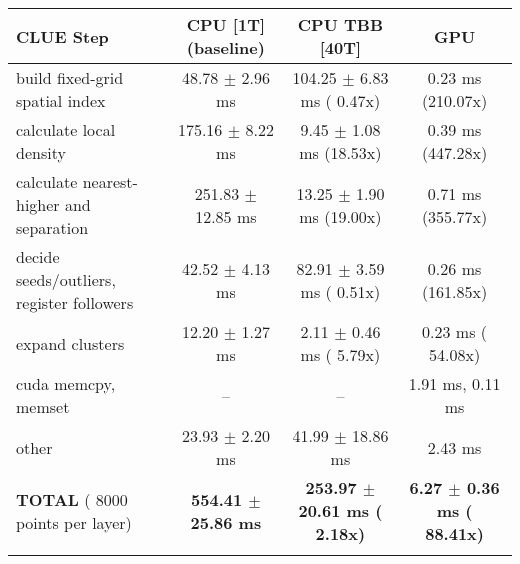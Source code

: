     \begin{tabular}{l|c|c|c}
    \hline
    CLUE Step                                 & CPU [1T] (baseline)         & CPU TBB [40T]                         & GPU                       \\ \hline
    build fixed-grid spatial index            &  48.78 $\pm$  2.96 ms       & 104.25 $\pm$  6.83 ms ( 0.47x)        &   0.23 ms (210.07x)       \\
    calculate local density                   & 175.16 $\pm$  8.22 ms       &   9.45 $\pm$  1.08 ms (18.53x)        &   0.39 ms (447.28x)       \\
    calculate nearest-higher and separation   & 251.83 $\pm$ 12.85 ms       &  13.25 $\pm$  1.90 ms (19.00x)        &   0.71 ms (355.77x)       \\
    decide seeds/outliers, register followers &  42.52 $\pm$  4.13 ms       &  82.91 $\pm$  3.59 ms ( 0.51x)        &   0.26 ms (161.85x)       \\
    expand clusters                           &  12.20 $\pm$  1.27 ms       &   2.11 $\pm$  0.46 ms ( 5.79x)        &   0.23 ms ( 54.08x)       \\ \hline
    cuda memcpy, memset                       & --                          & --                                    &   1.91 ms,   0.11 ms      \\ 
    other                                     &  23.93 $\pm$  2.20 ms       &  41.99 $\pm$ 18.86 ms                 &   2.43 ms                 \\ \hline
    \textbf{TOTAL} ( 8000 points per layer)   & \textbf{554.41 $\pm$ 25.86 ms} & \textbf{253.97 $\pm$ 20.61 ms ( 2.18x)} & \textbf{  6.27 $\pm$  0.36 ms ( 88.41x)}  \\
    \hline
    \multicolumn{4}{c}{} 
    \end{tabular}
    \linebreak


